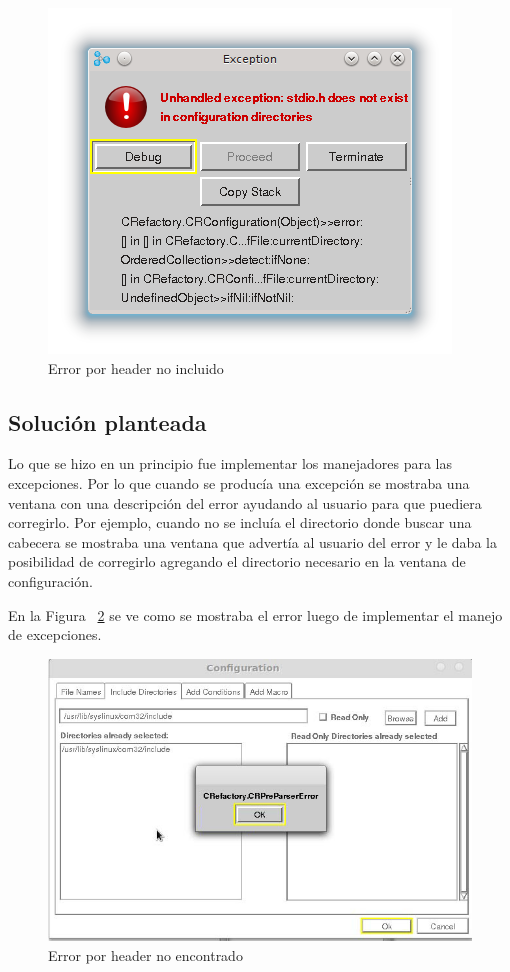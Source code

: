 \documentclass[a4paper,oneside,12pt]{article}
\begin{document}
\begin{figure}[h!]
  \centering
    \includegraphics[scale=0.85]{images/codigo_original/error_header_no_agregado.png}
     \caption{Error por header no incluido}
     \label{header_no_incluido}
\end{figure}

\subsection{Soluci\'on planteada}
Lo que se hizo en un principio fue implementar los manejadores para las excepciones. Por lo que cuando se produc\'ia una excepci\'on se mostraba una ventana con una descripci\'on del error ayudando al usuario para que puediera corregirlo. Por ejemplo, cuando no se inclu\'ia el directorio donde buscar una cabecera se mostraba una ventana que advert\'ia al usuario del error y le daba la posibilidad de corregirlo agregando el directorio necesario en la ventana de configuraci\'on.

En la Figura ~\ref{header_no_encontrado} se ve como se mostraba el error luego de implementar el manejo de excepciones.

\begin{figure}[h!]
  \centering
    \includegraphics[scale=0.50]{images/codigo_modificado/error_header_no_encontrado_sin_view_error.jpg}
     \caption{Error por header no encontrado}
     \label{header_no_encontrado}
\end{figure}
\end{document}
